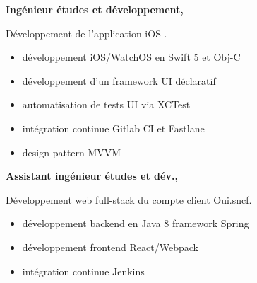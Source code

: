 \documentclass{cv}
\begin{document}
\noindent\begin{minipage}[t]{.65\textwidth}


\newlength{\logoboxwidth}
\setlength{\logoboxwidth}{20mm}

\begin{mainexpbox}[title=nov. 2019 -- aujourd'hui]

	\begin{minipage}[t]{\logoboxwidth}%
	\centering
	\end{minipage}
	\begin{minipage}[t]{0.8\textwidth}
	\textbf{Ingénieur études et développement, \evtech{}}

	Développement de l'application iOS \href{https://apps.apple.com/fr/app/oui-sncf-train-et-bus/id343889987}{}.

	\begin{itemize}
	\item développement iOS/WatchOS en Swift 5 et Obj-C
	\item développement d'un framework UI déclaratif
	\item automatisation de tests UI via XCTest
	\item intégration continue Gitlab CI et Fastlane
	\item design pattern MVVM
	\end{itemize}
	\end{minipage}

\end{mainexpbox}

\begin{expbox}[title={déc. 2016, \faicon{clock-o} 3 ans}]

	\begin{minipage}[t]{\logoboxwidth}
	\centering
	\end{minipage}
	\begin{minipage}[t]{0.8\textwidth}
	\textbf{Assistant ingénieur études et dév., \evtech{}}

	Développement web full-stack du compte client Oui.sncf.

	\begin{itemize}
	\item développement backend en Java 8 framework Spring
	\item développement frontend React/Webpack
	\item intégration continue Jenkins
	\end{itemize}
	\end{minipage}


\end{expbox}
\end{minipage}
\end{document}
